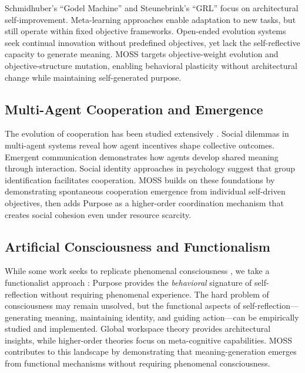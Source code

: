 \documentclass{article}
\begin{document}
Schmidhuber's ``Godel Machine'' \citep{schmidhuber2007godel} and Steunebrink's ``GRL'' \citep{steunebrink2016grl} focus on architectural self-improvement. Meta-learning approaches \citep{finn2017maml, schmidhuber1996simple} enable adaptation to new tasks, but still operate within fixed objective frameworks. Open-ended evolution systems \citep{stanley2017open, lehman2011abandoning} seek continual innovation without predefined objectives, yet lack the self-reflective capacity to generate meaning. MOSS targets objective-weight evolution and objective-structure mutation, enabling behavioral plasticity without architectural change while maintaining self-generated purpose.

\subsection{Multi-Agent Cooperation and Emergence}

The evolution of cooperation has been studied extensively \citep{axelrod1984evolution, foerster2016learning, hughes2018inequity}. Social dilemmas in multi-agent systems \citep{leibo2017multi, dafoe2020cooperative} reveal how agent incentives shape collective outcomes. Emergent communication \citep{lazaridou2016multi, foerster2016learning, cogswell2019emergent} demonstrates how agents develop shared meaning through interaction. Social identity approaches \citep{tajfel1979integrative, turner1985social} in psychology suggest that group identification facilitates cooperation. MOSS builds on these foundations by demonstrating spontaneous cooperation emergence from individual self-driven objectives, then adds Purpose as a higher-order coordination mechanism that creates social cohesion even under resource scarcity.

\subsection{Artificial Consciousness and Functionalism}

While some work seeks to replicate phenomenal consciousness \citep{degrazia2020artificial, gamez2014human, degrazia2012creation}, we take a functionalist approach \citep{putnam1960minds, block1978troubles, lewis1972psychophysical}: Purpose provides the \textit{behavioral} signature of self-reflection without requiring phenomenal experience. The hard problem of consciousness \citep{chalmers1995facing} may remain unsolved, but the functional aspects of self-reflection—generating meaning, maintaining identity, and guiding action—can be empirically studied and implemented. Global workspace theory \citep{baars2005global, dehaene2017consciousness} provides architectural insights, while higher-order theories \citep{rosenthal2005consciousness} focus on meta-cognitive capabilities. MOSS contributes to this landscape by demonstrating that meaning-generation emerges from functional mechanisms without requiring phenomenal consciousness.
\end{document}
